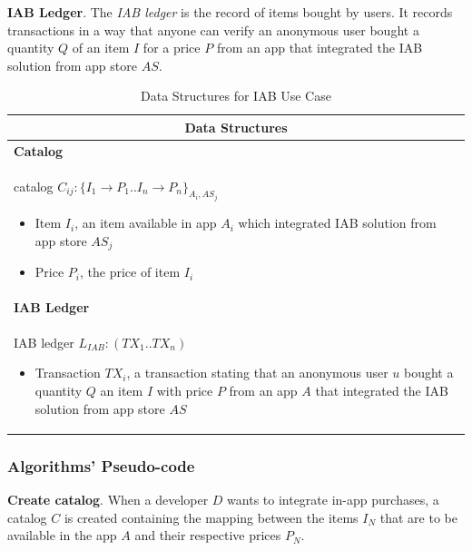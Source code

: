 \noindent \textbf{IAB Ledger}. The \textit{IAB ledger} is the record of items bought by users. It records transactions in a way that anyone can verify an anonymous user bought a quantity $Q$ of an item $I$ for a price $P$ from an app that integrated the IAB solution from app store $AS$.
\begin{table}[H]
\footnotesize
\centering
\begin{tabular}{|p{}|}
\hline
\multicolumn{1}{|c|}{Data Structures} \\
\hline \vspace{0.05cm}
\textbf{Catalog} \\
catalog $C_{ij} : \{I_1 \to P_1..I_n \to P_n\}_{A_i, AS_j}$
\begin{itemize}
	\item Item $I_i$, an item available in app $A_i$ which integrated IAB solution from app store $AS_j$
	\item Price $P_i$, the price of item $I_i$
\end{itemize} \\
\textbf{IAB Ledger} \\
IAB ledger $L_{IAB} : (TX_1..TX_n)$
\begin{itemize}
	\item Transaction $TX_i$, a transaction stating that an anonymous user $u$ bought a quantity $Q$ an item $I$ with price $P$ from an app $A$ that integrated the IAB solution from app store $AS$
\end{itemize} \\
\hline
\end{tabular}
\caption{Data Structures for IAB Use Case}
\label{table: data_structures_iab}
\end{table}


\subsubsection{Algorithms' Pseudo-code}


\noindent \textbf{Create catalog}. When a developer $D$ wants to integrate in-app purchases, a catalog $C$ is created containing the mapping between the items $I_N$ that are to be available in the app $A$ and their respective prices $P_N$. \\

